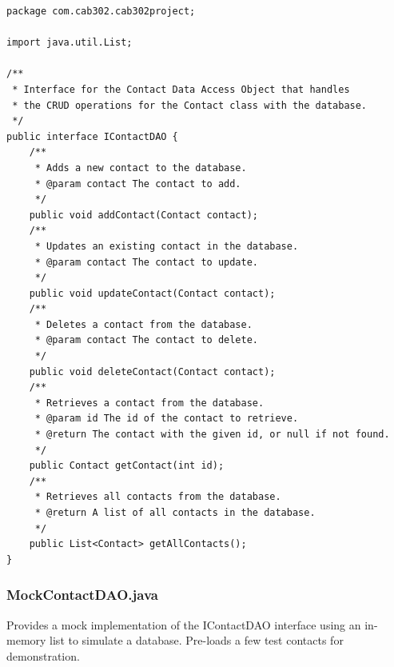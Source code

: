 \documentclass{article}
\begin{document}
\begin{verbatim}
package com.cab302.cab302project;

import java.util.List;

/**
 * Interface for the Contact Data Access Object that handles
 * the CRUD operations for the Contact class with the database.
 */
public interface IContactDAO {
    /**
     * Adds a new contact to the database.
     * @param contact The contact to add.
     */
    public void addContact(Contact contact);
    /**
     * Updates an existing contact in the database.
     * @param contact The contact to update.
     */
    public void updateContact(Contact contact);
    /**
     * Deletes a contact from the database.
     * @param contact The contact to delete.
     */
    public void deleteContact(Contact contact);
    /**
     * Retrieves a contact from the database.
     * @param id The id of the contact to retrieve.
     * @return The contact with the given id, or null if not found.
     */
    public Contact getContact(int id);
    /**
     * Retrieves all contacts from the database.
     * @return A list of all contacts in the database.
     */
    public List<Contact> getAllContacts();
}
\end{verbatim}
\subsubsection*{MockContactDAO.java}
Provides a mock implementation of the IContactDAO interface using an in-memory list to simulate a database. Pre-loads a few test contacts for demonstration.
\end{document}
